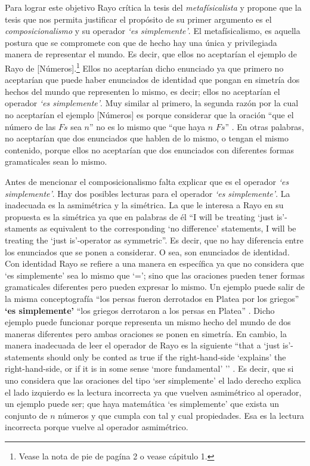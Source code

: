 \documentclass[]{article}
\begin{document}
Para lograr este objetivo Rayo crítica la tesis del \textit{metafísicalista} 
y propone que la tesis que nos permita justificar el prop\'osito de
su primer argumento es el \textit{composicionalismo} y su operador
\textit{`es simplemente'}. El metafísicalismo, es aquella postura 
que se compromete con que de hecho hay una única y privilegiada 
manera de representar el mundo. Es decir, que ellos no aceptarían 
el ejemplo de Rayo de [Números].\footnote{Vease la nota de pie de 
pagína 2 o vease \cite{rayo2013} cápitulo 1.} Ellos no aceptarían 
dicho enunciado ya que primero no aceptarían que puede 
haber enunciados de identidad que pongan en simetría dos hechos 
del mundo que representen lo mismo, es decir; ellos no aceptarían 
el operador \textit{`es simplemente'}. Muy similar al primero,
la segunda razón por la cual no aceptarían el ejemplo [Números] 
es porque considerar que la oración ``que el número de las $Fs$
sea $n$'' no es lo mismo que ``que haya $n$ $Fs$'' \cite{rayo2013}. 
En otras palabras, no aceptar\'ian que dos enunciados que hablen de 
lo mismo, o tengan el mismo contenido, porque ellos no aceptarían que 
dos enunciados con diferentes formas gramaticales sean lo mismo. 

Antes de mencionar el composicionalismo falta explicar 
que es el operador \textit{`es simplemente'}. Hay dos posibles 
lecturas para el operador \textit{`es simplemente'}. La 
inadecuada es la asmim\'etrica y la sim\'etrica. La que le interesa a 
Rayo en su propuesta es la sim\'etrica ya que en palabras de él
``I will be treating ‘just is’-staments as equivalent to the 
corresponding ‘no difference’ statements, I will be treating 
the ‘just is’-operator as symmetric''\cite{rayo2013construction}. 
Es decir, que no hay diferencia entre los enunciados que se ponen 
a considerar. O sea, son enunciados de identidad. Con identidad
Rayo se refiere a una manera en espec\'ifica ya que no considera 
que `es simplemente' sea lo mismo que `='; sino que las 
oraciones pueden tener formas gramaticales diferentes pero 
pueden expresar lo mismo. Un ejemplo puede salir de la misma 
conceptografía ``los persas fueron derrotados en Platea por los 
griegos'' \textbf{`es simplemente'} ``los griegos derrotaron a los 
persas en Platea'' \cite{frege2016escritos}. Dicho ejemplo 
puede funcionar porque representa un mismo hecho del mundo 
de dos maneras diferentes pero ambas oraciones se ponen en simetría.
En cambio, la manera inadecuada de leer el operador de Rayo es 
la siguiente ``that a `just is’-statements should only be conted as true 
if the right-hand-side `explains’ the right-hand-side, or if it is in 
some sense `more fundamental’ '' \cite{rayo2013construction}. 
Es decir, que si uno considera que las oraciones del tipo `ser simplemente'
el lado derecho explica el lado izquierdo es la lectura incorrecta 
ya que vuelven asmim\'etrico al operador, un ejemplo puede ser; 
que haya matemática `es simplemente' que exista un conjunto de $n$ 
números y que cumpla con tal y cual propiedades. Esa es la lectura 
incorrecta porque vuelve al operador asmim\'etrico. 
\end{document}
